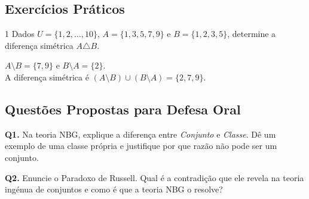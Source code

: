 \subsection{Exercícios Práticos}

\begin{exercisebox}{1}
  Dados $U=\{1,2,\ldots,10\}$, $A=\{1,3,5,7,9\}$ e $B=\{1,2,3,5\}$, determine a diferença simétrica $A \triangle B$.
\end{exercisebox}
\begin{solbox}
  $A \setminus B = \{7,9\}$ e $B \setminus A = \{2\}$. \\
  A diferença simétrica é $(A \setminus B) \cup (B \setminus A) = \{2,7,9\}$.
\end{solbox}

\subsection{Questões Propostas para Defesa Oral}

\begin{oralbox}
  \textbf{Q1.} Na teoria NBG, explique a diferença entre \emph{Conjunto} e \emph{Classe}. Dê um exemplo de uma classe própria e justifique por que razão não pode ser um conjunto.
\end{oralbox}

\begin{oralbox}
  \textbf{Q2.} Enuncie o Paradoxo de Russell. Qual é a contradição que ele revela na teoria ingénua de conjuntos e como é que a teoria NBG o resolve?
\end{oralbox}